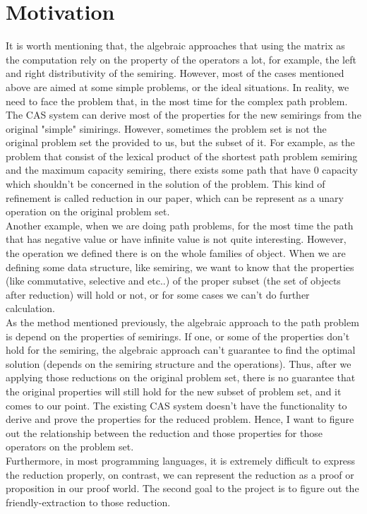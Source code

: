 \documentclass[a4paper,12pt,twoside,openright]{report}
\begin{document}
\section{Motivation}
It is worth mentioning that, the algebraic approaches that using the matrix as the computation rely on the property of the operators a lot, for example, the left and right distributivity of the semiring.
However, most of the cases mentioned above are aimed at some simple problems, or the ideal situations. 
In reality, we need to face the problem that, in the most time for the complex path problem. 
The CAS system can derive most of the properties for the new semirings from the original "simple" simirings. 
However, sometimes the problem set is not the original problem set the provided to us, but the subset of it. For example, as the problem that consist of the lexical product of the shortest path problem semiring and the maximum capacity semiring, there exists some path that have 0 capacity which shouldn't be concerned in the solution of the problem. This kind of refinement is called reduction in our paper, which can be represent as a unary operation on the original problem set.\\
Another example, when we are doing path problems, for the most time the path that has negative value or have infinite value is not quite interesting. However, the operation we defined there is on the whole families of object. When we are defining some data structure, like semiring, we want to know that the properties (like commutative, selective and etc..) of the proper subset (the set of objects after reduction) will hold or not, or for some cases we can't do further calculation.\\
As the method mentioned previously, the algebraic approach to the path problem is depend on the properties of semirings. If one, or some of the properties don't hold for the semiring, the algebraic approach can't guarantee to find the optimal solution (depends on the semiring structure and the operations). Thus, after we applying those reductions on the original problem set, there is no guarantee that the original properties will still hold for the new subset of problem set, and it comes to our point. The existing CAS system doesn't have the functionality to derive and prove the properties for the reduced problem. Hence, I want to figure out the relationship between the reduction and those properties for those operators on the problem set.\\
Furthermore, in most programming languages, it is extremely difficult to express the reduction properly, on contrast, we can represent the reduction as a proof or proposition in our proof world. The second goal to the project is to figure out the friendly-extraction to those reduction.
\end{document}
